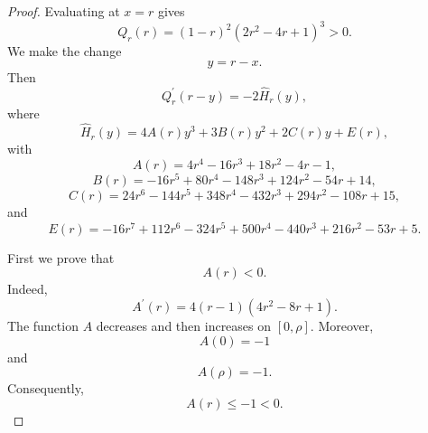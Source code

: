 \documentclass[11pt,a4paper]{article}
\numberwithin{equation}{section}
\numberwithin{table}{section}
\theoremstyle{plain}
\theoremstyle{definition}\newtheorem{definition}[theorem]{Definition}
\theoremstyle{remark}\newtheorem{remark}[theorem]{Remark}
\begin{document}
\begin{proof}
Evaluating at $x=r$ gives 
\begin{equation*}
Q_r(r)=(1-r)^2(2r^2-4r+1)^3>0.
\end{equation*}
We make the change 
\begin{equation*}
y=r-x.
\end{equation*}
Then 
\begin{equation*}
Q_r^{\prime}(r-y)=-2\widehat H_r(y),
\end{equation*}
where 
\begin{equation*}
\widehat H_r(y)=4A(r)y^3+3B(r)y^2+2C(r)y+E(r),
\end{equation*}
with 
\begin{equation*}
A(r)=4r^4-16r^3+18r^2-4r-1,
\end{equation*}
\begin{equation*}
B(r)=-16r^5+80r^4-148r^3+124r^2-54r+14,
\end{equation*}
\begin{equation*}
C(r)=24r^6-144r^5+348r^4-432r^3+294r^2-108r+15,
\end{equation*}
and 
\begin{equation*}
E(r)=-16r^7+112r^6-324r^5+500r^4-440r^3+216r^2-53r+5.
\end{equation*}

First we prove that 
\begin{equation*}
A(r)<0.
\end{equation*}
Indeed, 
\begin{equation*}
A^{\prime}(r)=4(r-1)(4r^2-8r+1).
\end{equation*}
The function $A$ decreases and then increases on $[0,\rho]$.
Moreover, 
\begin{equation*}
A(0)=-1
\end{equation*}
and 
\begin{equation*}
A(\rho)=-1.
\end{equation*}
Consequently, 
\begin{equation*}
A(r)\leq -1<0.
\end{equation*}


\end{proof}
\end{document}
